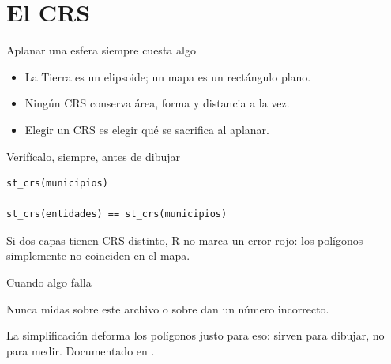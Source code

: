 \section{El CRS}

\begin{frame}{Aplanar una esfera siempre cuesta algo}
  \vspace{0.3em}
  \begin{itemize}\setlength{\itemsep}{0.85em}
    \item<1-> La Tierra es un elipsoide; un mapa es un rectángulo
          plano.
    \item<2-> Ningún \ac{CRS} conserva área, forma y distancia a la
          vez.
    \item<3-> Elegir un CRS es elegir qué se sacrifica al aplanar.
  \end{itemize}

  \vspace{1.1em}
\end{frame}

\begin{frame}[fragile]{Verifícalo, siempre, antes de dibujar}
\begin{lstlisting}
st_crs(municipios)

st_crs(entidades) == st_crs(municipios)
\end{lstlisting}

  \vspace{0.6em}
  Si dos capas tienen CRS distinto, R no marca un error rojo: los
  polígonos simplemente no coinciden en el mapa.
\end{frame}

\begin{frame}{Cuando algo falla}
  \vspace{0.4em}
  \begin{errorbox}{Nunca midas sobre este archivo}
     o  sobre
     dan un número incorrecto.

    \vspace{0.5em}
    La simplificación deforma los polígonos justo para eso: sirven
    para \ac{dibujar}, no para \ac{medir}. Documentado en
    .
  \end{errorbox}
\end{frame}

